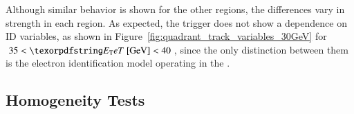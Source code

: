 Although similar behavior is shown for the other 
regions, the differences vary in strength in each \abseta{} region. As expected, 
the trigger does not show a dependence on ID variables, as shown in Figure~\ref{fig:quadrant_track_variables_30GeV} for $35<\et{}~[\text{GeV}]<40$, since the only distinction between them is the electron identification model operating in the \fastcalo{}.

\FloatBarrier
\subsection[Homogeneity Tests]{Homogeneity Tests}\label{ssec:agreement}

